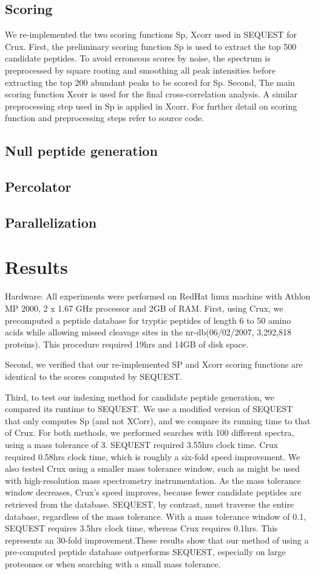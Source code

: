 \documentclass{bioinfo}
\begin{document}
\subsection*{Scoring}
We re-implemented the two scoring functions Sp, Xcorr used in SEQUEST
for Crux.  First, the preliminary scoring function Sp is used to
extract the top 500 candidate peptides. To avoid erroneous scores by
noise, the spectrum is preprocessed by square rooting and smoothing
all peak intensities before extracting the top 200 abundant peaks to
be scored for Sp.  Second, The main scoring function Xcorr is used for
the final cross-correlation analysis. A similar preprocessing step
used in Sp is applied in Xcorr. For further detail on scoring function
and preprocessing steps refer to source code.

\subsection*{Null peptide generation}
\subsection*{Percolator}
\subsection*{Parallelization}

\section{Results}

Hardware: All experiments were performed on RedHat linux machine with
Athlon MP 2000, 2 x 1.67 GHz processor and 2GB of RAM.  First, using
Crux, we precomputed a peptide database for tryptic peptides of length
6 to 50 amino acids while allowing missed cleavage sites in the
nr-db(06/02/2007, 3,292,818 proteins). This procedure required 19hrs
and 14GB of disk space.

Second, we verified that our re-implemented SP and Xcorr scoring
functions are identical to the scores computed by SEQUEST.

Third, to test our indexing method for candidate peptide generation,
we compared its runtime to SEQUEST.  We use a modified version of
SEQUEST that only computes Sp (and not XCorr), and we compare its
running time to that of Crux.  For both methods, we performed searches
with 100 different spectra, using a mass tolerance of 3.  SEQUEST
required 3.55hrs clock time. Crux required 0.58hrs clock time, which
is roughly a six-fold speed improvement. We also tested Crux using a
smaller mass tolerance window, such as might be used with
high-resolution mass spectrometry instrumentation.  As the mass
tolerance window decreases, Crux's speed improves, because fewer
candidate peptides are retrieved from the database.  SEQUEST, by
contrast, must traverse the entire database, regardless of the mass
tolerance.  With a mass tolerance window of 0.1, SEQUEST requires
3.5hrs clock time, whereas Crux requires 0.1hrs.  This represents an
30-fold improvement.These results show that our method of using a
pre-computed peptide database outperforms SEQUEST, especially on large
proteomes or when searching with a small mass tolerance.
\end{document}
